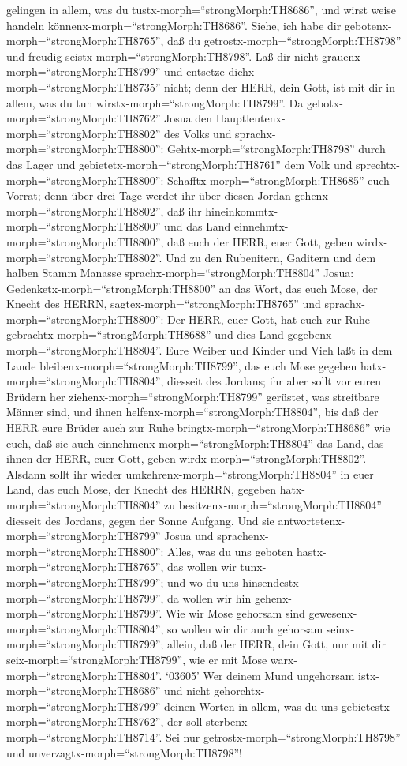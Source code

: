 gelingen in allem, was du tustx-morph=``strongMorph:TH8686'', und wirst
weise handeln könnenx-morph=``strongMorph:TH8686''.  Siehe,
ich habe dir gebotenx-morph=``strongMorph:TH8765'', daß du
getrostx-morph=``strongMorph:TH8798'' und freudig
seistx-morph=``strongMorph:TH8798''. Laß dir nicht
grauenx-morph=``strongMorph:TH8799'' und entsetze
dichx-morph=``strongMorph:TH8735'' nicht; denn der HERR, dein Gott, ist
mit dir in allem, was du tun wirstx-morph=``strongMorph:TH8799''.
 Da gebotx-morph=``strongMorph:TH8762'' Josua den
Hauptleutenx-morph=``strongMorph:TH8802'' des Volks und
sprachx-morph=``strongMorph:TH8800'': 
Gehtx-morph=``strongMorph:TH8798'' durch das Lager und
gebietetx-morph=``strongMorph:TH8761'' dem Volk und
sprechtx-morph=``strongMorph:TH8800'':
Schafftx-morph=``strongMorph:TH8685'' euch Vorrat; denn über drei Tage
werdet ihr über diesen Jordan gehenx-morph=``strongMorph:TH8802'', daß
ihr hineinkommtx-morph=``strongMorph:TH8800'' und das Land
einnehmtx-morph=``strongMorph:TH8800'', daß euch der HERR, euer Gott,
geben wirdx-morph=``strongMorph:TH8802''.  Und zu den
Rubenitern, Gaditern und dem halben Stamm Manasse
sprachx-morph=``strongMorph:TH8804'' Josua: 
Gedenketx-morph=``strongMorph:TH8800'' an das Wort, das euch Mose, der
Knecht des HERRN, sagtex-morph=``strongMorph:TH8765'' und
sprachx-morph=``strongMorph:TH8800'': Der HERR, euer Gott, hat euch zur
Ruhe gebrachtx-morph=``strongMorph:TH8688'' und dies Land
gegebenx-morph=``strongMorph:TH8804''.  Eure Weiber und
Kinder und Vieh laßt in dem Lande bleibenx-morph=``strongMorph:TH8799'',
das euch Mose gegeben hatx-morph=``strongMorph:TH8804'', diesseit des
Jordans; ihr aber sollt vor euren Brüdern her
ziehenx-morph=``strongMorph:TH8799'' gerüstet, was streitbare Männer
sind, und ihnen helfenx-morph=``strongMorph:TH8804'',  bis
daß der HERR eure Brüder auch zur Ruhe
bringtx-morph=``strongMorph:TH8686'' wie euch, daß sie auch
einnehmenx-morph=``strongMorph:TH8804'' das Land, das ihnen der HERR,
euer Gott, geben wirdx-morph=``strongMorph:TH8802''. Alsdann sollt ihr
wieder umkehrenx-morph=``strongMorph:TH8804'' in euer Land, das euch
Mose, der Knecht des HERRN, gegeben hatx-morph=``strongMorph:TH8804'' zu
besitzenx-morph=``strongMorph:TH8804'' diesseit des Jordans, gegen der
Sonne Aufgang.  Und sie
antwortetenx-morph=``strongMorph:TH8799'' Josua und
sprachenx-morph=``strongMorph:TH8800'': Alles, was du uns geboten
hastx-morph=``strongMorph:TH8765'', das wollen wir
tunx-morph=``strongMorph:TH8799''; und wo du uns
hinsendestx-morph=``strongMorph:TH8799'', da wollen wir hin
gehenx-morph=``strongMorph:TH8799''.  Wie wir Mose gehorsam
sind gewesenx-morph=``strongMorph:TH8804'', so wollen wir dir auch
gehorsam seinx-morph=``strongMorph:TH8799''; allein, daß der HERR, dein
Gott, nur mit dir seix-morph=``strongMorph:TH8799'', wie er mit Mose
warx-morph=``strongMorph:TH8804''.  `03605' Wer deinem Mund
ungehorsam istx-morph=``strongMorph:TH8686'' und nicht
gehorchtx-morph=``strongMorph:TH8799'' deinen Worten in allem, was du
uns gebietestx-morph=``strongMorph:TH8762'', der soll
sterbenx-morph=``strongMorph:TH8714''. Sei nur
getrostx-morph=``strongMorph:TH8798'' und
unverzagtx-morph=``strongMorph:TH8798''!

